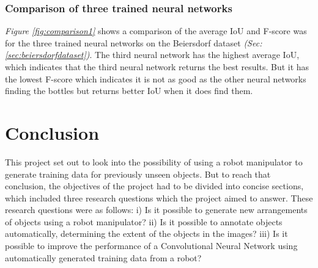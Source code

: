 \subsection{Comparison of three trained neural networks}
\textit{Figure \ref{fig:comparison1}} shows a comparison of the average IoU and F-score was for the three trained neural networks on the Beiersdorf dataset \textit{(Sec: \ref{sec:beiersdorfdataset})}. The third neural network has the highest average IoU, which indicates that the third neural network returns the best results. But it has the lowest F-score which indicates it is not as good as the other neural networks finding the bottles but returns better IoU when it does find them.



\clearpage
\chapter{Conclusion}\label{sec:conclusions}
This project set out to look into the possibility of using a robot manipulator to generate training data for previously unseen objects. But to reach that conclusion, the objectives of the project had to be divided into concise sections, which included three research questions which the project aimed to answer. These research questions were as follows: i) Is it possible to generate new arrangements of objects using a robot manipulator? ii) Is it possible to annotate objects automatically, determining the extent of the objects in the images? iii) Is it possible to improve the performance of a Convolutional Neural Network using automatically generated training data from a robot?

